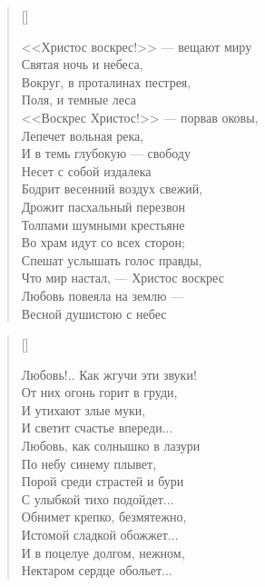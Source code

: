 \settowidth{\versewidth}{<<Христос воскрес!>> --- вещают миру}
\begin{verse}[\versewidth]
\begin{altverse}
<<Христос воскрес!>> --- вещают миру\\
	Святая ночь и небеса,\\
Вокруг, в проталинах пестрея,\\
    Поля, и темные леса\ldotst\\
<<Воскрес Христос!>> --- порвав оковы,\\
    Лепечет вольная река,\\
И в темь глубокую --- свободу\\
    Несет с собой издалека\ldotst\\
Бодрит весенний воздух свежий,\\
    Дрожит пасхальный перезвон\ldotst\\
Толпами шумными крестьяне\\
    Во храм идут со всех сторон;\\
Спешат услышать голос правды,\\
    Что мир настал, --- Христос воскрес\ldotst\\
Любовь повеяла на землю ---\\
    Весной душистою с небес\ldotst\\
\end{altverse}
\end{verse}


\newpage
\vspace*{0cm}


\settowidth{\versewidth}{Любовь!.. Как жгучи эти звуки!}
\begin{verse}[\versewidth]
\begin{altverse}
Любовь!.. Как жгучи эти звуки!\\
    От них огонь горит в груди,\\
И утихают злые муки,\\
    И светит счастье впереди...\\
Любовь, как солнышко в лазури\\
    По небу синему плывет,\\
Порой среди страстей и бури\\
    С улыбкой тихо подойдет...\\
Обнимет крепко, безмятежно,\\
    Истомой сладкой обожжет...\\
И в поцелуе долгом, нежном,\\
    Нектаром сердце обольет...\\
\end{altverse}
\end{verse}

